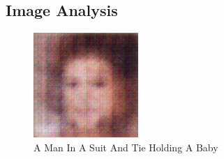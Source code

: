 \documentclass{article}%
\begin{document}
%
\subsection{Image Analysis}%
\label{subsec:ImageAnalysis}%


\begin{figure}[h!]%
\centering%
\includegraphics[width=150px]{500_fake_images/samples_5_370.png}%
\caption{A Man In A Suit And Tie Holding A Baby}%
\end{figure}

%
\end{document}
